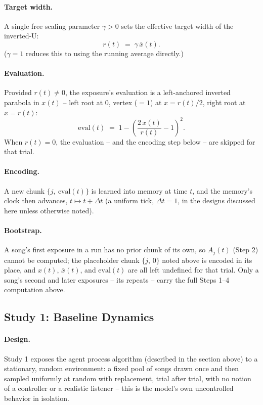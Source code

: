 \documentclass[letterpaper]{article} %
\begin{document}
\paragraph{Target width.}
A single free scaling parameter $\gamma > 0$ sets the effective target width
of the inverted-U:
\[
r(t) \;=\; \gamma\, \bar x(t).
\]
($\gamma = 1$ reduces this to using the running average directly.)

\paragraph{Evaluation.}
Provided $r(t) \neq 0$, the exposure's evaluation is a left-anchored inverted
parabola in $x(t)$ -- left root at $0$, vertex ($=1$) at $x = r(t)/2$, right
root at $x = r(t)$:
\[
\mathrm{eval}(t) \;=\; 1 - \left( \frac{2\,x(t)}{r(t)} - 1 \right)^{\!2}.
\]
When $r(t) = 0$, the evaluation -- and the encoding step below -- are skipped
for that trial.

\paragraph{Encoding.}
A new chunk $\{j,\ \mathrm{eval}(t)\}$ is learned into memory at time $t$, and
the memory's clock then advances, $t \mapsto t + \Delta t$ (a uniform tick,
$\Delta t = 1$, in the designs discussed here unless otherwise noted).

\paragraph{Bootstrap.}
A song's first exposure in a run has no prior chunk of its own, so $A_j(t)$
(Step 2) cannot be computed; the placeholder chunk $\{j,\,0\}$ noted above is
encoded in its place, and $x(t)$, $\bar x(t)$, and $\mathrm{eval}(t)$ are all
left undefined for that trial. Only a song's second and later exposures --
its repeats -- carry the full Steps 1--4 computation above.

\subsection*{Study 1: Baseline Dynamics}

\paragraph{Design.}
Study 1 exposes the agent process algorithm (described in the section above) to a stationary,
random environment: a fixed pool of songs drawn once and then sampled
uniformly at random with replacement, trial after trial, with no notion of a
controller or a realistic listener -- this is the model's own uncontrolled
behavior in isolation.
\end{document}
